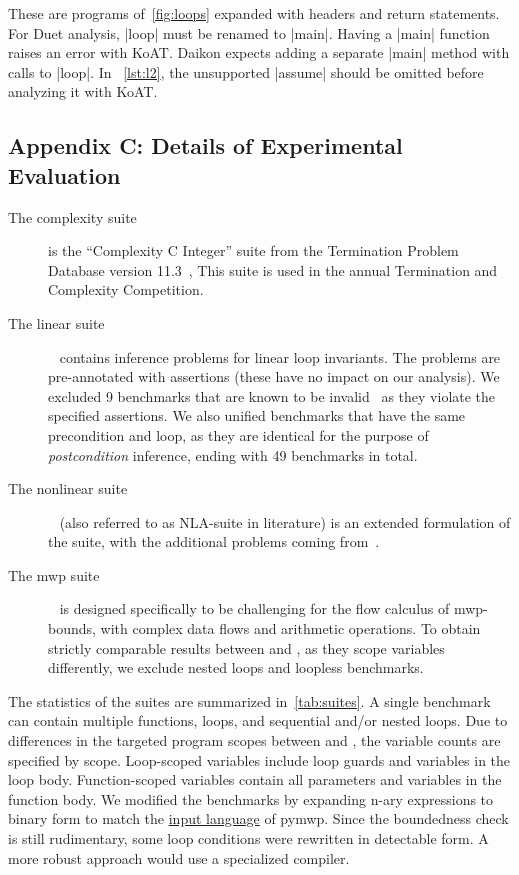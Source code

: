 These are programs of~\autoref{fig:loops} expanded with headers and return statements.
For Duet analysis, \pr|loop| must be renamed to \pr|main|.
Having a \pr|main| function raises an error with KoAT\@.
Daikon expects adding a separate \pr|main| method with calls to \pr|loop|.
In ~\autoref{lst:l2}, the unsupported \pr|assume| should be omitted before analyzing it with KoAT\@.

\subsection{Appendix C: Details of Experimental Evaluation}
\label{app:subsec:bench}
\begin{description}

\item[The {complexity} suite] is the \enquote{Complexity C Integer} suite from the Termination Problem Database version 11.3~\cite{tpdb},
This suite is used in the annual Termination and Complexity Competition.

\item[The linear suite]~\cite{si2018} contains inference problems for linear loop invariants.
The problems are pre-annotated with assertions (these have no impact on our analysis).
We excluded 9 benchmarks that are known to be invalid~\cite[Appendix G]{ryan2020} as they violate the specified assertions.
We also unified benchmarks that have the same precondition and loop, as they are identical for the purpose of \emph{postcondition} inference,
ending with 49 benchmarks in total.

\item[The nonlinear suite]~\cite{nguyen2017} (also referred to as NLA-suite in literature) is an extended formulation of the suite, with the additional problems coming from~\cite{yu2023}.

\item[The {mwp} suite]~\cite{aubert2023b} is designed specifically to be challenging for the flow calculus of mwp-bounds, with complex data flows and arithmetic operations.
To obtain strictly comparable results between \impl and \impf, as they scope variables differently, we exclude nested loops and loopless benchmarks.

\end{description}

The statistics of the suites are summarized in~\autoref{tab:suites}.
A single benchmark can contain multiple functions, loops, and sequential and/or nested loops.
Due to differences in the targeted program scopes between \impl and \impf, the variable counts are specified by scope.
Loop-scoped variables include loop guards and variables in the loop body.
Function-scoped variables contain all parameters and variables in the function body.
We modified the benchmarks by expanding n-ary expressions to binary form to match the \href{https://statycc.github.io/pymwp/features/}{input language} of pymwp.
Since the boundedness check is still rudimentary, some loop conditions were rewritten in detectable form.
A more robust approach would use a specialized compiler.

